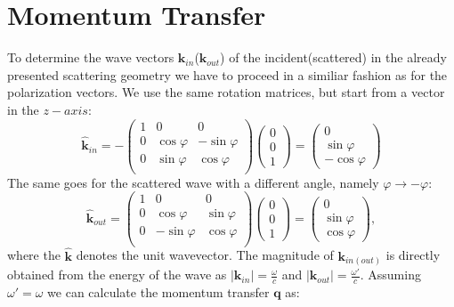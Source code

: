 \documentclass[twocolumn,amsmath,superscriptaddress,amssymb]{revtex4-1}
\renewcommand{\thefigure}{Fig.\arabic{figure}}
\renewcommand{\theequation}{Eq.\arabic{equation}}
\let\vec\mathbf
\begin{document}
\section{Momentum Transfer}
\renewcommand{\thefigure}{Fig.B\arabic{figure}}
\renewcommand{\theequation}{Eq.B\arabic{equation}}

To determine the wave vectors $\vec{k}_{in}$($\vec{k}_{out}$) of the incident(scattered) in the already presented scattering geometry we have to proceed in a similiar fashion as for the polarization  vectors. We use the same rotation matrices, but start from a vector in the $z-axis$:
\begin{equation}
\hat{\vec{k}}_{in} = -\left(
\begin{array}{ccc}
1&0&0\\
0&\cos\varphi&-\sin\varphi\\
0&\sin\varphi&\cos\varphi\\
\end{array}\right)\left(
\begin{array}{c}
0\\0\\1
\end{array}\right)=\left(
\begin{array}{c}
0\\ \sin\varphi \\ -\cos \varphi
\end{array}\right)
\end{equation}
The same goes for the scattered wave with a different angle, namely $\varphi\to -\varphi$:
\begin{equation}
\hat{\vec{k}}_{out} = \left(
\begin{array}{ccc}
1&0&0\\
0&\cos\varphi&\sin\varphi\\
0&-\sin\varphi&\cos\varphi\\
\end{array}\right)\left(
\begin{array}{c}
0\\0\\1
\end{array}\right)=\left(
\begin{array}{c}
0\\ \sin\varphi \\ \cos \varphi
\end{array}\right),
\end{equation}
\noindent where the $\hat{\vec{k}}$ denotes the unit wavevector. The magnitude of $\vec{k}_{in(out)}$ is directly obtained from the energy of the wave as $|\vec{k}_{in}|=\frac{\omega}{c}$ and $|\vec{k}_{out}|=\frac{\omega '}{c}$. Assuming $\omega '=\omega$ we can calculate the momentum transfer $\vec{q}$ as:
\end{document}
